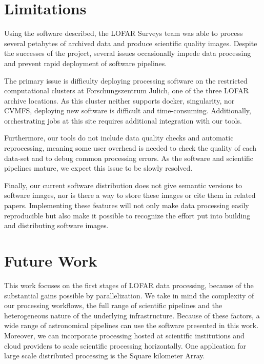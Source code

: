\section{Limitations}

Using the software described, the LOFAR Surveys team was able to process several petabytes of archived data and produce scientific quality images. Despite the successes of the project, several issues occasionally impede data processing and prevent rapid deployment of software pipelines.

The primary issue is difficulty deploying processing software on the restricted computational clusters at Forschungszentrum J{\:u}lich, one of the three LOFAR archive locations. As this cluster neither supports docker, singularity, nor CVMFS, deploying new software is difficult and time-consuming. Additionally, orchestrating jobs at this site requires additional integration with our tools.

Furthermore, our tools do not include data quality checks and automatic reprocessing, meaning some user overhead is needed to check the quality of each data-set and to debug common processing errors. As the software and scientific pipelines mature, we expect this issue to be slowly resolved.

Finally, our current software distribution does not give semantic versions to software images, nor is there a way to store these images or cite them in related papers. Implementing these features will not only make data processing easily reproducible but also make it possible to recognize the effort put into building and distributing software images.


\section{Future Work}

This work focuses on the first stages of LOFAR data processing, because of the substantial gains possible by parallelization. We take in mind the complexity of our processing workflows, the full range of scientific pipelines and the heterogeneous nature of the underlying infrastructure. Because of these factors, a wide range of astronomical pipelines can use the software presented in this work. Moreover, we can incorporate processing hosted at scientific institutions and cloud providers to scale scientific processing horizontally. One application for large scale distributed processing is the Square kilometer Array. 

